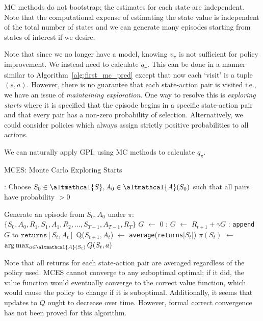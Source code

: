 \documentclass{article}
\newcommand*\Let[2]{\State #1 $\gets$ #2}
\newcommand{\ix}[1]{%
  \leavevmode %
  \marginpar{\small\emph{#1}}%
}
\begin{document}
MC methods do not bootstrap; the estimates for each state are independent. Note that the computational expense of estimating the state value is independent of the total number of states and we can generate many episodes starting from states of interest if we desire. 

Note that since we no longer have a model, knowing $v_\pi$ is not sufficient for policy improvement. We instead need to calculate $q_\pi$. This can be done in a manner similar to Algorithm~\ref{alg:first_mc_pred} except that now each `visit' is a tuple $(s, a)$.\ix{Exploring Starts} However, there is no guarantee that each state-action pair is visited i.e., we have an issue of \textit{maintaining exploration}. One way to resolve this is \textit{exploring starts} where it is specified that the episode begins in a specific state-action pair and that every pair has a non-zero probability of selection. Alternatively, we could consider policies which always assign strictly positive probabilities to all actions. 

\ix{Monte Carlo Control}We can naturally apply GPI, using MC methods to calculate $q_\pi$. 
\begin{algorithm}[H]
	\caption{MCES: Monte Carlo Exploring Starts
		\label{alg:mces}}
	\begin{algorithmic}[1]
		\Statex
		\Loop: 
		\State Choose $S_0 \in \altmathcal{S}, A_0 \in \altmathcal{A}(S_0)$ such that all pairs have probability $>0$
		
		\State Generate an episode from $S_0, A_0$ under $\pi$: $\lbrace S_0, A_0, R_1, S_1, A_1, R_2, ..., S_{T-1}, A_{T-1}, R_T \rbrace$
		\Let{$G$}{$0$}
		:
		\Let{$G$}{$R_{t+1} + \gamma G$} 
		:
		\State \texttt{append} $G$ to $\texttt{returns}[S_t, A_t]$
		\Let{Q($S_{t+1}, A_t$)}{\texttt{average}(\texttt{returns}[$S_t$])}
		\Let{$\pi(S_t)$}{$\arg \max_{a \in \altmathcal{A}(S_t)} Q(S_t, a)$}
		\EndIf
		\EndFor
		\EndLoop
	\end{algorithmic}
\end{algorithm}
Note that all returns for each state-action pair are averaged regardless of the policy used. MCES cannot converge to any suboptimal optimal; if it did, the value function would eventually converge to the correct value function, which would cause the policy to change if it is suboptimal. Additionally, it seems that updates to $Q$ ought to decrease over time. However, formal correct convergence has not been proved for this algorithm. 
\end{document}
